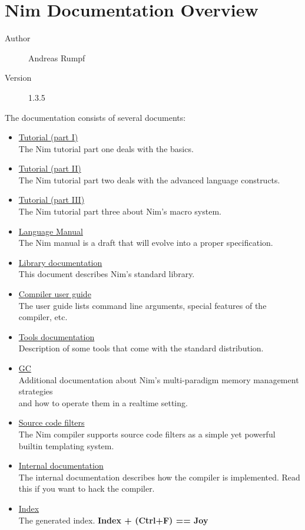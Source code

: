 \hypertarget{nim-documentation-overview}{%
\section{Nim Documentation Overview}\label{nim-documentation-overview}}

\begin{description}
\item[Author]
Andreas Rumpf
\item[Version]
1.3.5
\end{description}

The documentation consists of several documents:

\begin{itemize}
\item
  \href{tut1.html}{Tutorial (part I)}\\
  The Nim tutorial part one deals with the basics.
\item
  \href{tut2.html}{Tutorial (part II)}\\
  The Nim tutorial part two deals with the advanced language constructs.
\item
  \href{tut3.html}{Tutorial (part III)}\\
  The Nim tutorial part three about Nim's macro system.
\item
  \href{manual.html}{Language Manual}\\
  The Nim manual is a draft that will evolve into a proper
  specification.
\item
  \href{lib.html}{Library documentation}\\
  This document describes Nim's standard library.
\item
  \href{nimc.html}{Compiler user guide}\\
  The user guide lists command line arguments, special features of the
  compiler, etc.
\item
  \href{tools.html}{Tools documentation}\\
  Description of some tools that come with the standard distribution.
\item
  \href{gc.html}{GC}\\
  Additional documentation about Nim's multi-paradigm memory management
  strategies\\
  and how to operate them in a realtime setting.
\item
  \href{filters.html}{Source code filters}\\
  The Nim compiler supports source code filters as a simple yet powerful
  builtin templating system.
\item
  \href{intern.html}{Internal documentation}\\
  The internal documentation describes how the compiler is implemented.
  Read this if you want to hack the compiler.
\item
  \href{theindex.html}{Index}\\
  The generated index. \textbf{Index + (Ctrl+F) == Joy}
\end{itemize}
